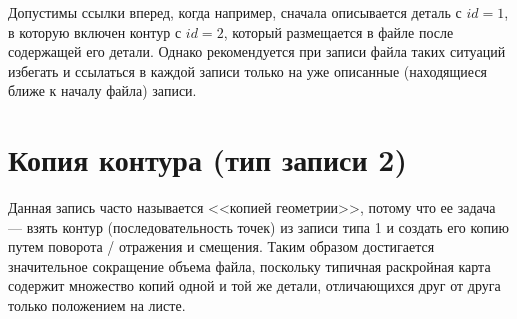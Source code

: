 Допустимы ссылки вперед,
когда например, сначала описывается деталь с
$id=1$,
в которую включен контур с
$id=2$,
который размещается в файле после содержащей его детали.
Однако рекомендуется при записи файла таких ситуаций избегать
и ссылаться в каждой записи только на уже описанные
(находящиеся ближе к началу файла)
записи.

\section*{Копия контура (тип записи 2)}
Данная запись часто называется <<копией геометрии>>,
потому что ее задача ---
взять контур
(последовательность точек)
из записи типа 1 и создать его копию путем поворота / отражения и смещения.
Таким образом достигается значительное
сокращение объема файла,
поскольку типичная раскройная карта
содержит множество копий одной и той же детали,
отличающихся друг от друга только положением на листе.


